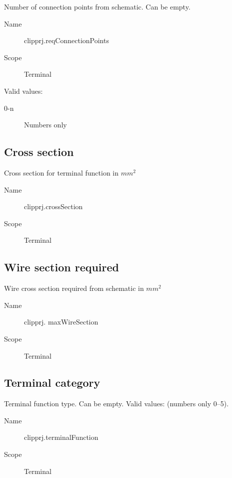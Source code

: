 \documentclass[%
	a4paper,
	oneside,
	listof=numbered,
	parskip=half,
	headsepline=true,
	footsepline=false,
	0.7headlines,
	]{scrbook}
\begin{document}
Number of connection points from schematic.
Can be empty.\\

\begin{description}
	\item[Name] clipprj.reqConnectionPoints
	\item[Scope] Terminal
\end{description}

Valid values:

\begin{description}
	\item[0-n] Numbers only
\end{description}

\subsection{Cross section}

Cross section for terminal function in $mm^2$

\begin{description}
	\item[Name] clipprj.crossSection
	\item[Scope] Terminal
\end{description}

\subsection{Wire section required}

Wire cross section required from schematic in $mm^2$

\begin{description}
	\item[Name] clipprj.
	maxWireSection
	\item[Scope] Terminal
\end{description}

\subsection{Terminal category}

Terminal function type.
Can be empty.
Valid values: (numbers only 0--5).

\begin{description}
	\item[Name] clipprj.terminalFunction
	\item[Scope] Terminal
\end{description}
\end{document}
